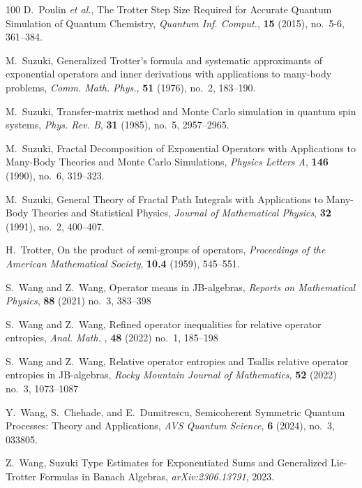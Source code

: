 \documentclass{article}
\theoremstyle{plain} %
\numberwithin{equation}{section}
\begin{document}
\begin{thebibliography}{100}
    D.~Poulin \textit{et al.},  
    The Trotter Step Size Required for Accurate Quantum Simulation of Quantum Chemistry,  
    \textit{Quantum Inf. Comput.}, \textbf{15} (2015), no.~5-6, 361--384.
    
    M.~Suzuki,  
   Generalized Trotter's formula and systematic approximants of exponential operators and inner derivations with applications to many-body problems,  
    \textit{Comm. Math. Phys.}, \textbf{51} (1976), no.~2, 183--190.    

    M.~Suzuki,  
   Transfer-matrix method and Monte Carlo simulation in quantum spin systems,  
    \textit{Phys. Rev. B}, \textbf{31} (1985), no.~5, 2957--2965.        
    

    M.~Suzuki,  
    Fractal Decomposition of Exponential Operators with Applications to Many-Body Theories and Monte Carlo Simulations,  
    \textit{Physics Letters A}, \textbf{146} (1990), no.~6, 319--323.

    M.~Suzuki,  
    General Theory of Fractal Path Integrals with Applications to Many-Body Theories and Statistical Physics,  
    \textit{Journal of Mathematical Physics}, \textbf{32} (1991), no.~2, 400--407.



    H.~Trotter,
    On the product of semi-groups of operators, 
    \textit{Proceedings of the American Mathematical Society}, \textbf{10.4} (1959), 545--551.

    S.~Wang and Z.~Wang, 
    Operator means in JB-algebras, 
    \textit{Reports on Mathematical Physics}, \textbf{88} (2021) no.~3, 383--398 

    S.~Wang and Z.~Wang, 
Refined operator inequalities for relative operator entropies,
 \textit{Anal. Math. }, \textbf{48} (2022) no.~1, 185--198
    
        S.~Wang and Z.~Wang, 
    Relative operator entropies and Tsallis relative operator entropies in JB-algebras, 
    \textit{Rocky Mountain Journal of Mathematics}, \textbf{52} (2022) no.~3, 1073--1087

    Y.~Wang, S.~Chehade, and E.~Dumitrescu,  
    Semicoherent Symmetric Quantum Processes: Theory and Applications,  
    \textit{AVS Quantum Science}, \textbf{6} (2024), no.~3, 033805.    
    
    Z.~Wang,  
    Suzuki Type Estimates for Exponentiated Sums and Generalized Lie-Trotter Formulas in Banach Algebras,  
    \textit{arXiv:2306.13791}, 2023.


\end{thebibliography}
\end{document}
